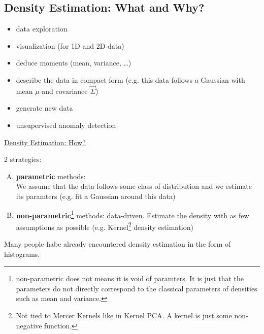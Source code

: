 \begin{frame}
\end{frame}

\begin{frame}

\section{Density Estimation: What and Why?}


\begin{itemize}
\item data exploration
\item visualization (for 1D and 2D data)
\item deduce moments (mean, variance, \ldots)
\item describe the data in compact form (e.g. this data follows a Gaussian with mean $\mu$ and covariance $\vec \Sigma$)
\item generate new data
\item unsupervised anomaly detection
\end{itemize}

\end{frame}

\begin{frame}

\underline{Density Estimation: How?}

2 strategies:

\begin{enumerate}[(A)]
\item \textbf{parametric} methods:
\\ We assume that the data follows some class of distribution and we estimate its paramters (e.g. fit a Gaussian around this data)
\item \textbf{non-parametric}\footnote{non-parametric does not means it is void of paramters. 
It is just that the parameters do not directly correspond to the classical parameters of densities such as mean and variance.} methods: 
data-driven. Estimate the density with as few assumptions as possible (e.g. Kernel\footnote{Not tied to Mercer Kernels like in Kernel PCA. A kernel is just some non-negative function.} density estimation)
\end{enumerate}

\end{frame}

Many people habe already encountered density estimation in the form of histograms.


